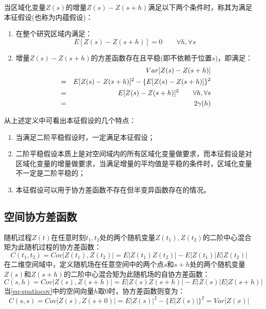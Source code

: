 当区域化变量$Z(s)$的增量$Z(s)-Z(s+h)$满足以下两个条件时，称其为满足本征假设(也称为内蕴假设)：
\begin{enumerate}
    \item 在整个研究区域内满足：
        \begin{equation}
            E[Z(s)-Z(s+h)] = 0 \qquad \forall h, \forall s
            \label{eq-intrinsiccondition1}
        \end{equation}
    \item 增量$Z(s)-Z(s+h)$的方差函数存在且平稳(即不依赖于位置$s$)，即满足：
        \begin{eqnarray}
            && Var[Z(s)-Z(s+h)] \notag \\
            &=& E[Z(s)-Z(s+h)]^2 - \{ E[Z(s)-Z(s+h)] \}^2 \notag \\
            &=& E[Z(s)-Z(s+h)]^2 \qquad \forall h, \forall s \\
            &=& 2 \gamma (h) \notag
            \label{eq-intrinsiccondition2}
        \end{eqnarray}
\end{enumerate}

从上述定义中可看出本征假设的几个特点：
\begin{enumerate}
    \item 当满足二阶平稳假设时，一定满足本征假设；
    \item 二阶平稳假设本质上是\textcolor[rgb]{1,0,0}{对空间域内的所有区域化变量做要求，而本征假设是对区域化变量的增量做要求}，当满足增量的平均值是平稳的条件时，区域化变量不一定是二阶平稳的；
    \item 本征假设可以用于\textcolor[rgb]{1,0,0}{协方差函数不存在但半变异函数存在的情况}。
\end{enumerate}



\subsection{空间协方差函数}
随机过程$Z(t)$在任意时刻$t_1,t_2$处的两个随机变量$Z(t_1),Z(t_2)$的二阶中心混合矩为此随机过程的协方差函数：
\begin{equation}
    C(t_1,t_2) = Cov\left| Z(t_1),Z(t_2) \right| = E\left| Z(t_1)Z(t_2) \right| - E\left| Z(t_1) \right| E\left| Z(t_2) \right|
    \label{eq-temporalcov}
\end{equation}
在二维空间域中，定义随机场在任意空间中的两个点$s$和$s+h$处的两个随机变量$Z(s)$和$Z(s+h)$的二阶中心混合矩为此随机场的自协方差函数：
\begin{equation}
    C(s,h) = Cov\left| Z(s),Z(s+h) \right| = E\left| Z(s)Z(s+h) \right|-E\left| Z(s) \right| E\left| Z(s+h) \right|
    \label{eq-spatiocov}
\end{equation}
当\cref{eq-spatiocov}中的空间向量$h$取0时，协方差函数则变为：
\begin{equation}
    C(s,s) = Cov\left| Z(s), Z(s+0) \right| = E\left| Z(s) \right|^2 - \{ E\left| Z(s) \right| \}^2 = Var\left| Z(x) \right|
    \label{eq-spatiocovsimplize}
\end{equation}

